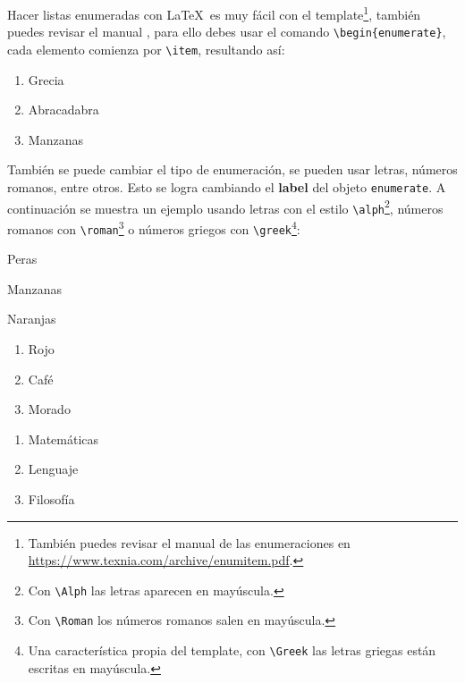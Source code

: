 \clearpage
{}


		Hacer listas enumeradas con \LaTeX\ es muy fácil con el template\footnote{También puedes revisar el manual de las enumeraciones en \url{https://www.texnia.com/archive/enumitem.pdf}.}, también puedes revisar el manual \cite{templatelatex}, para ello debes usar el comando \texttt{\textbackslash begin\{enumerate\}}, cada elemento comienza por \texttt{\textbackslash item}, resultando así:

		\begin{enumerate}
			\item Grecia
			\item Abracadabra
			\item Manzanas
		\end{enumerate}

		También se puede cambiar el tipo de enumeración, se pueden usar letras, números romanos, entre otros. Esto se logra cambiando el \textbf{label} del objeto \texttt{enumerate}. A continuación se muestra un ejemplo usando letras con el estilo \texttt{\textbackslash alph}\footnote{Con \texttt{\textbackslash Alph} las letras aparecen en mayúscula.}, números romanos con \texttt{\textbackslash roman}\footnote{Con \texttt{\textbackslash Roman} los números romanos salen en mayúscula.} o números griegos con \texttt{\textbackslash greek}\footnote{Una característica propia del template, con \texttt{\textbackslash Greek} las letras griegas están escritas en mayúscula.}:

		\begin{multicols}{3}
			\begin{enumeratebf}[label=\alph*) ] %
				\item Peras
				\item Manzanas
				\item Naranjas
			\end{enumeratebf}

			\begin{enumerate}[label=\roman*) ]
				\item Rojo
				\item Café
				\item Morado
			\end{enumerate}
			
			\begin{enumerate}[label=\greek*) ]
				\item Matemáticas
				\item Lenguaje
				\item Filosofía
			\end{enumerate}
		\end{multicols}

